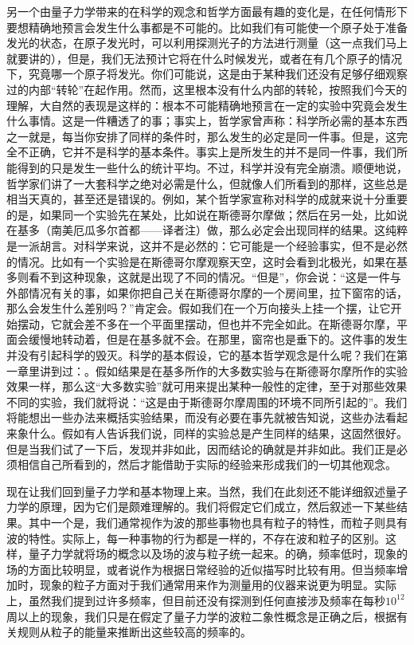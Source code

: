 另一个由量子力学带来的在科学的观念和哲学方面最有趣的变化是，在任何情形下要想精确地预言会发生什么事都是不可能的。比如我们有可能使一个原子处于准备发光的状态，在原子发光时，可以利用探测光子的方法进行测量（这一点我们马上就要讲的），但是，我们无法预计它将在什么时候发光，或者在有几个原子的情况下，究竟哪一个原子将发光。你们可能说，这是由于某种我们还没有足够仔细观察过的内部“转轮”在起作用。然而，这里根本没有什么内部的转轮，按照我们今天的理解，大自然的表现是这样的：根本不可能精确地预言在一定的实验中究竟会发生什么事情。这是一件糟透了的事；事实上，哲学家曾声称：科学所必需的基本东西之一就是，每当你安排了同样的条件时，那么发生的必定是同一件事。但是，这完全不正确，它并不是科学的基本条件。事实上是所发生的并不是同一件事，我们所能得到的只是发生一些什么的统计平均。不过，科学并没有完全崩溃。顺便地说，哲学家们讲了一大套科学之绝对必需是什么，但就像人们所看到的那样，这些总是相当天真的，甚至还是错误的。例如，某个哲学家宣称对科学的成就来说十分重要的是，如果同一个实验先在某处，比如说在斯德哥尔摩做；然后在另一处，比如说在基多（南美厄瓜多尔首都——译者注）做，那么必定会出现同样的结果。这纯粹是一派胡言。对科学来说，这并不是必然的：它可能是一个经验事实，但不是必然的情况。比如有一个实验是在斯德哥尔摩观察天空，这时会看到北极光，如果在基多则看不到这种现象，这就是出现了不同的情况。“但是”，你会说：“这是一件与外部情况有关的事，如果你把自己关在斯德哥尔摩的一个房间里，拉下窗帘的话，那么会发生什么差别吗？”肯定会。假如我们在一个万向接头上挂一个摆，让它开始摆动，它就会差不多在一个平面里摆动，但也并不完全如此。在斯德哥尔摩，平面会缓慢地转动着，但是在基多就不会。在那里，窗帘也是垂下的。这件事的发生并没有引起科学的毁灭。科学的基本假设，它的基本哲学观念是什么呢？我们在第一章里讲到过：。假如结果是在基多所作的大多数实验与在斯德哥尔摩所作的实验效果一样，那么这“大多数实验”就可用来提出某种一般性的定律，至于对那些效果不同的实验，我们就将说：“这是由于斯德哥尔摩周围的环境不同所引起的”。我们将能想出一些办法来概括实验结果，而没有必要在事先就被告知说，这些办法看起来象什么。假如有人告诉我们说，同样的实验总是产生同样的结果，这固然很好。但是当我们试了一下后，发现并非如此，因而结论的确就是并非如此。我们正是必须相信自己所看到的，然后才能借助于实际的经验来形成我们的一切其他观念。

现在让我们回到量子力学和基本物理上来。当然，我们在此刻还不能详细叙述量子力学的原理，因为它们是颇难理解的。我们将假定它们成立，然后叙述一下某些结果。其中一个是，我们通常视作为波的那些事物也具有粒子的特性，而粒子则具有波的特性。实际上，每一种事物的行为都是一样的，不存在波和粒子的区别。这样，量子力学就将场的概念以及场的波与粒子统一起来。的确，频率低时，现象的场的方面比较明显，或者说作为根据日常经验的近似描写时比较有用。但当频率增加时，现象的粒子方面对于我们通常用来作为测量用的仪器来说更为明显。实际上，虽然我们提到过许多频率，但目前还没有探测到任何直接涉及频率在每秒$10^{12}$周以上的现象，我们只是在假定了量子力学的波粒二象性概念是正确之后，根据有关规则从粒子的能量来推断出这些较高的频率的。


